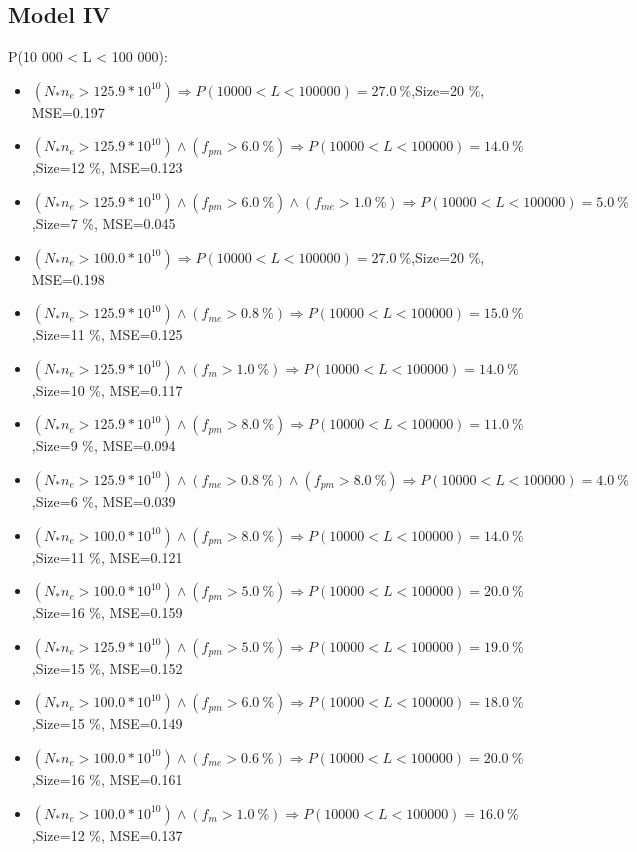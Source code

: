 \documentclass[numbered]{CSL}
\begin{document}
\subsection{Model IV}
P(10 000 < L < 100 000):
\begin{itemize}
\item $(N_* n_e > 125.9 * 10^{10}) \Rightarrow P(10 000 < L < 100 000) = 27.0~\%$,\hfill Size=20 \%, MSE=0.197
\item $(N_* n_e > 125.9 * 10^{10}) \land (f_{pm} > 6.0~\%) \Rightarrow P(10 000 < L < 100 000) = 14.0~\%$,\hfill Size=12 \%, MSE=0.123
\item $(N_* n_e > 125.9 * 10^{10}) \land (f_{pm} > 6.0~\%) \land (f_{me} > 1.0~\%) \Rightarrow P(10 000 < L < 100 000) = 5.0~\%$,\hfill Size=7 \%, MSE=0.045
\item $(N_* n_e > 100.0 * 10^{10}) \Rightarrow P(10 000 < L < 100 000) = 27.0~\%$,\hfill Size=20 \%, MSE=0.198
\item $(N_* n_e > 125.9 * 10^{10}) \land (f_{me} > 0.8~\%) \Rightarrow P(10 000 < L < 100 000) = 15.0~\%$,\hfill Size=11 \%, MSE=0.125
\item $(N_* n_e > 125.9 * 10^{10}) \land (f_m > 1.0~\%) \Rightarrow P(10 000 < L < 100 000) = 14.0~\%$,\hfill Size=10 \%, MSE=0.117
\item $(N_* n_e > 125.9 * 10^{10}) \land (f_{pm} > 8.0~\%) \Rightarrow P(10 000 < L < 100 000) = 11.0~\%$,\hfill Size=9 \%, MSE=0.094
\item $(N_* n_e > 125.9 * 10^{10}) \land (f_{me} > 0.8~\%) \land (f_{pm} > 8.0~\%) \Rightarrow P(10 000 < L < 100 000) = 4.0~\%$,\hfill Size=6 \%, MSE=0.039
\item $(N_* n_e > 100.0 * 10^{10}) \land (f_{pm} > 8.0~\%) \Rightarrow P(10 000 < L < 100 000) = 14.0~\%$,\hfill Size=11 \%, MSE=0.121
\item $(N_* n_e > 100.0 * 10^{10}) \land (f_{pm} > 5.0~\%) \Rightarrow P(10 000 < L < 100 000) = 20.0~\%$,\hfill Size=16 \%, MSE=0.159
\item $(N_* n_e > 125.9 * 10^{10}) \land (f_{pm} > 5.0~\%) \Rightarrow P(10 000 < L < 100 000) = 19.0~\%$,\hfill Size=15 \%, MSE=0.152
\item $(N_* n_e > 100.0 * 10^{10}) \land (f_{pm} > 6.0~\%) \Rightarrow P(10 000 < L < 100 000) = 18.0~\%$,\hfill Size=15 \%, MSE=0.149
\item $(N_* n_e > 100.0 * 10^{10}) \land (f_{me} > 0.6~\%) \Rightarrow P(10 000 < L < 100 000) = 20.0~\%$,\hfill Size=16 \%, MSE=0.161
\item $(N_* n_e > 100.0 * 10^{10}) \land (f_m > 1.0~\%) \Rightarrow P(10 000 < L < 100 000) = 16.0~\%$,\hfill Size=12 \%, MSE=0.137

\end{itemize}
\end{document}
